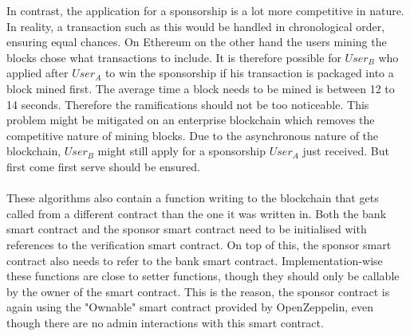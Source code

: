 In contrast, the application for a sponsorship is a lot more competitive in nature. In reality, a transaction such as this would be handled in chronological order, ensuring equal chances. On Ethereum on the other hand the users mining the blocks chose what transactions to include. It is therefore possible for $User_B$ who applied after $User_A$ to win the sponsorship if his transaction is packaged into a block mined first. The average time a block needs to be mined is between 12 to 14 seconds. Therefore the ramifications should not be too noticeable. This problem might be mitigated on an enterprise blockchain which removes the competitive nature of mining blocks. Due to the asynchronous nature of the blockchain, $User_B$ might still apply for a sponsorship $User_A$ just received. But first come first serve should be ensured.\\
\\
These algorithms also contain a function writing to the blockchain that gets called from a different contract than the one it was written in. Both the bank smart contract and the sponsor smart contract need to be initialised with references to the verification smart contract. On top of this, the sponsor smart contract also needs to refer to the bank smart contract. Implementation-wise these functions are close to setter functions, though they should only be callable by the owner of the smart contract. This is the reason, the sponsor contract is again using the "Ownable" smart contract provided by OpenZeppelin\cite{Zeppelin}, even though there are no admin interactions with this smart contract.\\
